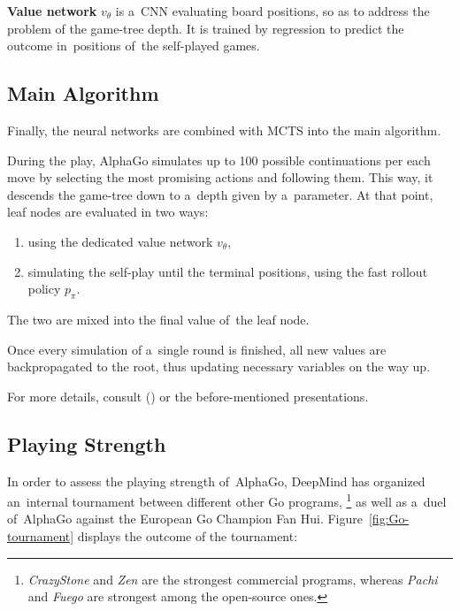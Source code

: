 \textbf{Value network} $v_\theta$ is a~CNN evaluating board positions, so as to address the problem of the game-tree depth.
It is trained by regression to predict the outcome in~positions of~the self-played games.

\subsection{Main Algorithm}

Finally, the neural networks are combined with MCTS into the main algorithm.

During the play, AlphaGo simulates up to 100 possible continuations per each move by selecting the most promising actions and following them.
This way, it descends the game-tree down to a~depth given by a~parameter.
At that point, leaf nodes are evaluated in two ways:
\begin{enumerate}[(1)]
  \item using the dedicated value network $v_\theta$,
  \item simulating the self-play until the terminal positions, using the fast rollout policy $p_\pi$.
\end{enumerate}
The two are mixed into the final value of~the leaf node.

Once every simulation of a~single round is finished, all new values are backpropagated to the root, thus updating necessary variables on the way up.

For more details, consult (\cite{Silver2016mastering}) or the before-mentioned presentations.


\subsection{Playing Strength}

In order to assess the playing strength of~AlphaGo, DeepMind has organized an~internal tournament between different other Go programs,%
\footnote{\emph{CrazyStone} and \emph{Zen} are the strongest commercial programs, whereas \emph{Pachi} and \emph{Fuego} are strongest among the open-source ones.}
as well as a~duel of~AlphaGo against the European Go Champion Fan Hui.
Figure~\ref{fig:Go-tournament} displays the outcome of the tournament:

